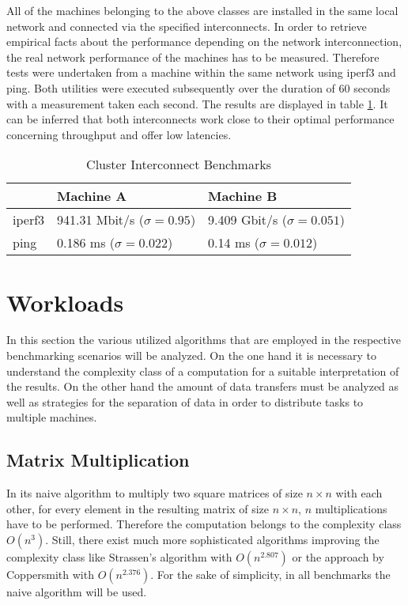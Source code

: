 All of the machines belonging to the above classes are installed in the same local network and connected via the specified interconnects. In order to retrieve empirical facts about the performance depending on the network interconnection, the real network performance of the machines has to be measured. Therefore tests were undertaken from a machine within the same network using iperf3 and ping. Both utilities were executed subsequently over the duration of 60 seconds with a measurement taken each second. The results are displayed in table \ref{table:cluster_interconnect_benchmarks}. It can be inferred that both interconnects work close to their optimal performance concerning throughput and offer low latencies.

\begin{table}[!htb]
	\centering
	\begin{adjustbox}{width=0.5\textwidth}
		\small
		\begin{tabular}{l | l | l}
			~                     & Machine A                 			& Machine B                  \\
			\hline
			iperf3                & 941.31 Mbit/s ($\sigma = 0.95$) 	& 9.409 Gbit/s ($\sigma = 0.051$) \\
			ping                  & 0.186 ms ($\sigma = 0.022$)  		& 0.14 ms ($\sigma = 0.012$)  \\
		\end{tabular}
	\end{adjustbox}
	
	\caption{Cluster Interconnect Benchmarks}
	\label{table:cluster_interconnect_benchmarks}
\end{table}

\section{Workloads}
\label{workload_explanation}
In this section the various utilized algorithms that are employed in the respective benchmarking scenarios will be analyzed. On the one hand it is necessary to understand the complexity class of a computation for a suitable interpretation of the results. On the other hand the amount of data transfers must be analyzed as well as strategies for the separation of data in order to distribute tasks to multiple machines.

\subsection*{Matrix Multiplication}
In its naive algorithm to multiply two square matrices of size $n\times n$ with each other, for every element in the resulting matrix of size $n\times n$, $n$ multiplications have to be performed. Therefore the computation belongs to the complexity class $O(n^3)$. Still, there exist much more sophisticated algorithms improving the complexity class like Strassen's algorithm with $O(n^{2.807})$\cite{strassen} or the approach by Coppersmith with $O(n^{2.376})$\cite{coppersmith}. For the sake of simplicity, in all benchmarks the naive algorithm will be used.

